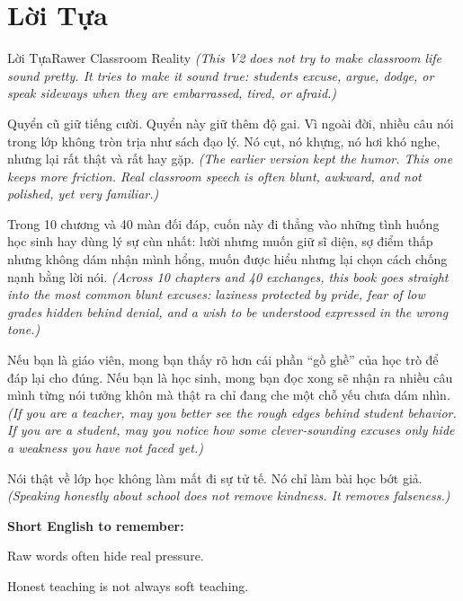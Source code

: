 \chapter*{Lời Tựa}

\begin{truyen}{Lời Tựa}{Rawer Classroom Reality}
\textit{(This V2 does not try to make classroom life sound pretty. It tries to make it sound true: students excuse, argue, dodge, or speak sideways when they are embarrassed, tired, or afraid.)}

Quyển cũ giữ tiếng cười. Quyển này giữ thêm độ gai. Vì ngoài đời, nhiều câu nói trong lớp không tròn trịa như sách đạo lý. Nó cụt, nó khựng, nó hơi khó nghe, nhưng lại rất thật và rất hay gặp.
\textit{(The earlier version kept the humor. This one keeps more friction. Real classroom speech is often blunt, awkward, and not polished, yet very familiar.)}

Trong 10 chương và 40 màn đối đáp, cuốn này đi thẳng vào những tình huống học sinh hay dùng lý sự cùn nhất: lười nhưng muốn giữ sĩ diện, sợ điểm thấp nhưng không dám nhận mình hổng, muốn được hiểu nhưng lại chọn cách chống nạnh bằng lời nói.
\textit{(Across 10 chapters and 40 exchanges, this book goes straight into the most common blunt excuses: laziness protected by pride, fear of low grades hidden behind denial, and a wish to be understood expressed in the wrong tone.)}

Nếu bạn là giáo viên, mong bạn thấy rõ hơn cái phần ``gồ ghề'' của học trò để đáp lại cho đúng. Nếu bạn là học sinh, mong bạn đọc xong sẽ nhận ra nhiều câu mình từng nói tưởng khôn mà thật ra chỉ đang che một chỗ yếu chưa dám nhìn.
\textit{(If you are a teacher, may you better see the rough edges behind student behavior. If you are a student, may you notice how some clever-sounding excuses only hide a weakness you have not faced yet.)}
\end{truyen}

\begin{baihoc}
Nói thật về lớp học không làm mất đi sự tử tế. Nó chỉ làm bài học bớt giả.
\textit{(Speaking honestly about school does not remove kindness. It removes falseness.)}
\end{baihoc}

\begin{ghinhoanh}
\textbf{Short English to remember:}

Raw words often hide real pressure.

Honest teaching is not always soft teaching.
\end{ghinhoanh}

